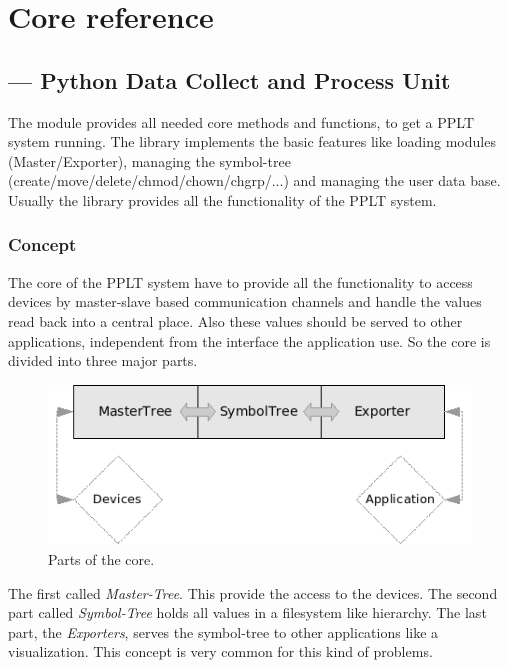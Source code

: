 \chapter{Core reference}
\section{ --- 
        \textbf{Py}thon \textbf{D}ata \textbf{C}ollect and \textbf{P}rocess \textbf{U}nit}





The  module provides all needed core methods and functions, to
get a PPLT system running. The library implements the basic features like 
loading modules (Master/Exporter), managing the symbol-tree 
(create/move/delete/chmod/chown/chgrp/...) and managing the user
data base. Usually the  library provides all the functionality
of the PPLT system. 

\subsection{Concept} 
The core of the PPLT system have to provide all the functionality to access devices
by master-slave based communication channels and handle the values read back into
a central place. Also these values should be served to other applications, independent
from the interface the application use. So the core is divided into three major parts.

\begin{figure}[ht]
    \centering
    \label{cDCPU}
    \includegraphics[scale=1]{cDCPU.png}
    \caption{Parts of the core.}
\end{figure}

The first called \textit{Master-Tree}. This provide the access to the devices. The 
second part called \textit{Symbol-Tree} holds all values in a filesystem like 
hierarchy. The last part, the \textit{Exporters}, serves the symbol-tree to other
applications like a visualization. This concept is very common for this kind of 
problems. 

